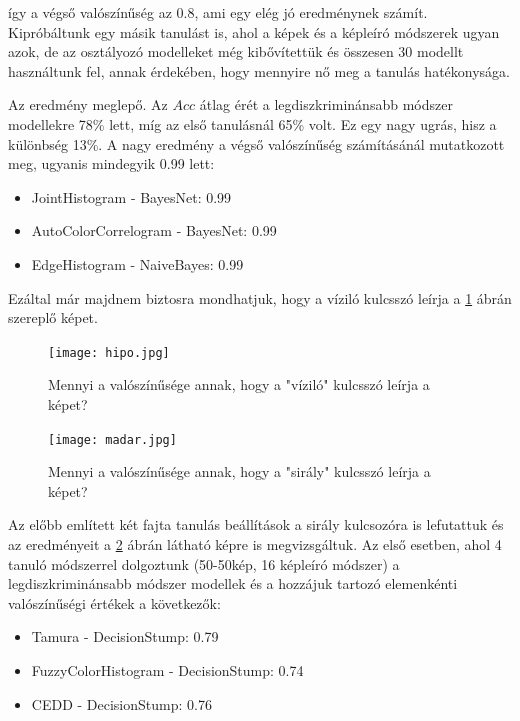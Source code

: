 \documentclass[12pt, a4paper, oneside]{book}
\theoremstyle{tetel}
\begin{document}
	így a végső valószínűség az 0.8, ami egy elég jó eredménynek számít.
	Kipróbáltunk egy másik tanulást is, ahol a képek és a képleíró módszerek ugyan azok, de az osztályozó modelleket még kibővítettük és összesen 30 modellt használtunk fel, annak érdekében, hogy mennyire nő meg a tanulás hatékonysága. 

	Az eredmény meglepő. Az $Acc$ átlag érét a legdiszkriminánsabb módszer modellekre 78\% lett, míg az első tanulásnál 65\% volt. Ez egy nagy ugrás, hisz a különbség 13\%. A nagy eredmény a végső valószínűség számításánál mutatkozott meg, ugyanis mindegyik 0.99 lett:

\begin{itemize}
  \item JointHistogram - BayesNet: 0.99
  \item AutoColorCorrelogram - BayesNet: 0.99
  \item EdgeHistogram - NaiveBayes: 0.99
\end{itemize}

	Ezáltal már majdnem biztosra mondhatjuk, hogy a víziló kulcsszó leírja a \ref{hipo} ábrán szereplő képet.

\begin{figure}[h]
\begin{center}
\texttt{[image: hipo.jpg]}
\caption{{ Mennyi a valószínűsége annak, hogy a "víziló" kulcsszó leírja a képet?}}
\label{hipo}
\end{center}
\end{figure}
	
\begin{figure}[h]
\begin{center}
\texttt{[image: madar.jpg]}
\caption{{ Mennyi a valószínűsége annak, hogy a "sirály" kulcsszó leírja a képet?}}
\label{madar}
\end{center}
\end{figure}

	Az előbb említett két fajta tanulás beállítások a sirály kulcsozóra is lefutattuk és az eredményeit a \ref{madar} ábrán látható képre is megvizsgáltuk. Az első esetben, ahol 4 tanuló módszerrel dolgoztunk (50-50kép, 16 képleíró módszer) a legdiszkriminánsabb módszer modellek és a hozzájuk tartozó elemenkénti valószínűségi értékek a következők:

\begin{itemize}
  \item Tamura - DecisionStump: 0.79
  \item FuzzyColorHistogram - DecisionStump: 0.74
  \item CEDD - DecisionStump: 0.76
\end{itemize}
\end{document}
